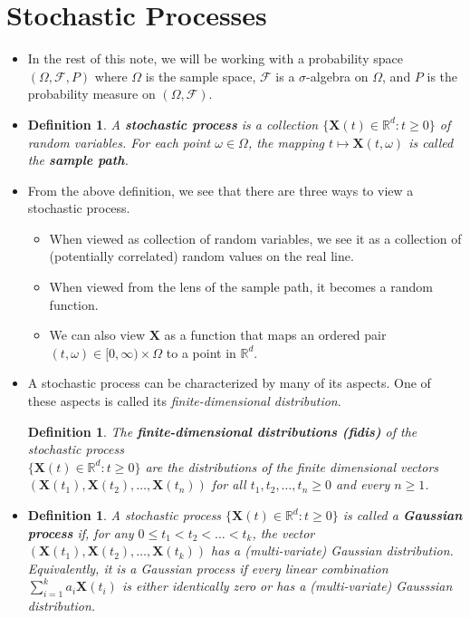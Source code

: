 \documentclass[10pt]{article}
\newtheorem{definition}[lemma]{Definition}
\newcommand{\ve}[1]{\mathbf{#1}}
\newcommand{\mcal}[1]{\mathcal{#1}}
\newcommand{\Real}{\mathbb{R}}
\begin{document}
\section{Stochastic Processes}

\begin{itemize}
  \item In the rest of this note, we will be working with a probability space $(\Omega, \mcal{F}, P)$ where $\Omega$ is the sample space, $\mcal{F}$ is a $\sigma$-algebra on $\Omega$, and $P$ is the probability measure on $(\Omega,\mcal{F})$.

  \item \begin{definition}
    A {\bf stochastic process} is a collection $\{\ve{X}(t) \in \Real^d : t \geq 0\}$ of random variables. For each point $\omega \in \Omega$, the mapping $t \mapsto \ve{X}(t,\omega)$ is called the {\bf sample path}.
  \end{definition}  

  \item From the above definition, we see that there are three ways to view a stochastic process.
  \begin{itemize}
    \item When viewed as collection of random variables, we see it as a collection of (potentially correlated) random values on the real line.
    \item When viewed from the lens of the sample path, it becomes a random function.
    \item We can also view $\ve{X}$ as a function that maps an ordered pair $(t, \omega) \in [0, \infty) \times \Omega$ to a point in $\Real^d$.
  \end{itemize}

  \item A stochastic process can be characterized by many of its aspects. One of these aspects is called its {\it finite-dimensional distribution}.
  
  \begin{definition}
    The {\bf finite-dimensional distributions (fidis)} of the stochastic process\\ $\{ \ve{X}(t) \in \Real^d: t \geq 0 \}$ are the distributions of the finite dimensional vectors $(\ve{X}(t_1), \ve{X}(t_2), \dotsc, \ve{X}(t_n))$ for all $t_1, t_2, \dotsc, t_n \geq 0$ and every $n \geq 1$.
  \end{definition}

  \item \begin{definition}
    A stochastic process $\{ \ve{X}(t) \in \Real^d: t \geq 0 \}$ is called a {\bf Gaussian process} if, for any $0 \leq t_1 < t_2 < \dotsc < t_k$, the vector $(\ve{X}(t_1), \ve{X}(t_2), \dotsc, \ve{X}(t_k))$ has a (multi-variate) Gaussian distribution. Equivalently, it is a Gaussian process if every linear combination $\sum_{i=1}^k a_i \ve{X}(t_i)$ is either identically zero or has a (multi-variate) Gausssian distribution.
  \end{definition}


\end{itemize}
\end{document}

